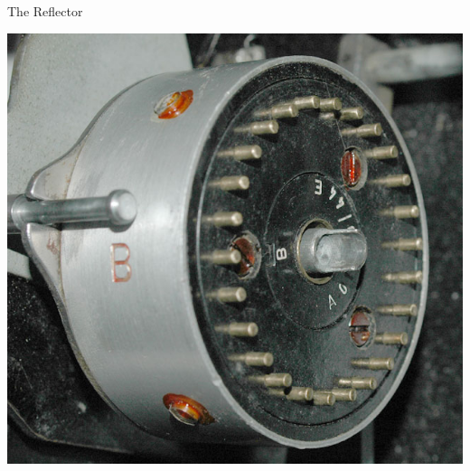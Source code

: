 \documentclass[hyphens,aspectratio=169]{beamer}
\begin{document}
\begin{frame}[fragile]{The Reflector}
	\begin{center}
		\includegraphics[scale=0.28]{paper/images/reflector.jpg}
	\end{center}
\end{frame}
\end{document}
